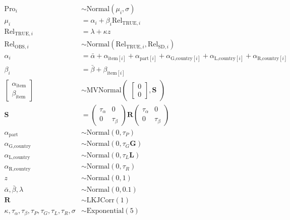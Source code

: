 \documentclass[english,man,floatsintext]{apa6}
\begin{document}
\[
\begin{aligned}
\text{Pro}_{i} &\sim \text{Normal}(\mu_{i},\sigma) \\
\mu_{i} &= \alpha_{i} + \beta_{i}\text{Rel}_{\text{TRUE},i} \\
\text{Rel}_{\text{TRUE},i} &= \lambda + \kappa z \\
\text{Rel}_{\text{OBS},i} &\sim \text{Normal}(\text{Rel}_{\text{TRUE},i}, \text{Rel}_{\text{SD},i}) \\
\alpha_{i} &= \bar{\alpha} + \alpha_{\text{item}[i]} + \alpha_{\text{part}[i]} + \alpha_{\text{G,country}[i]} + \alpha_{\text{L,country}[i]} + \alpha_{\text{R,country}[i]} \\
\beta_{i} &= \bar{\beta} + \beta_{\text{item}[i]} \\
\begin{bmatrix}\alpha_{\text{item}}\\
\beta_{\text{item}}\end{bmatrix} &\sim \text{MVNormal}
\begin{pmatrix}\begin{bmatrix}0\\0\end{bmatrix},\textbf{S}
\end{pmatrix}\\
\textbf{S} &=
\begin{pmatrix}\tau_{\alpha}&0\\0&\tau_{\beta}\end{pmatrix}
\textbf{R}
\begin{pmatrix}\tau_{\alpha}&0\\0&\tau_{\beta}\end{pmatrix} \\
\alpha_{\text{part}} &\sim \text{Normal}(0, \tau_{P}) \\
\alpha_{\text{G,country}} &\sim \text{Normal}(0, \tau_{G} \textbf{G}) \\
\alpha_{\text{L,country}} &\sim \text{Normal}(0, \tau_{L} \textbf{L}) \\
\alpha_{\text{R,country}} &\sim \text{Normal}(0, \tau_{R}) \\
z &\sim \text{Normal}(0, 1)\\
\bar{\alpha},\bar{\beta},\lambda &\sim \text{Normal}(0, 0.1) \\
\textbf{R} &\sim \text{LKJCorr}(1)\\
\kappa,\tau_{\alpha},\tau_{\beta},\tau_{P},\tau_{G},\tau_{L},\tau_{R},\sigma &\sim \text{Exponential}(5)
\end{aligned}
\]
\newpage
\end{document}
